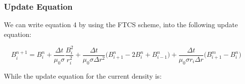 \documentclass{article}
\begin{document}
\subsubsection{Update Equation}
We can write equation 4 by using the FTCS scheme, into the following update equation:

\begin{equation}
B_i^{n+1} = B_i^n + \frac{\Delta t}{\mu_0 \sigma } \frac{B_i^2}{r_i^2} + \frac{\Delta t}{\mu_0 \sigma \Delta r^2} \Big(B_{i+1}^n - 2B_i^n + B_{i-1}^n \Big) + \frac{\Delta t}{\mu_0 \sigma r_i \Delta r} \Big(B_{i+1}^m - B_i^n \Big) 
\end{equation}

While the update equation for the current density is:

\begin{equation}

\end{equation}
\end{document}
